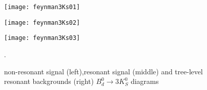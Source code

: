 \begin{figure}[h]
	\begin{minipage}[t]{0.33\linewidth} %
		\centering 
		\texttt{[image: feynman3Ks01]} 
		\label{fig:side:a} 
	\end{minipage}%
	\begin{minipage}[t]{0.33\linewidth} 
		\centering 
		\texttt{[image: feynman3Ks02]} 
		\label{fig:side:b} 
	\end{minipage}%
	\begin{minipage}[t]{0.33\linewidth} 
		\centering 
		\texttt{[image: feynman3Ks03]} 
		\label{fig:side:a} 
	\end{minipage} %
	\caption{non-resonant signal (left),resonant signal (middle) and tree-level resonant backgrounds (right)
		$B^0_d\to3K^0_S$ diagrams}.
\end{figure}


\begin{comment}
\begin{tikzpicture}
\begin{feynman}
\vertex (a1) {\( b\)};
\vertex[right=2cm of a1] (a3);
\vertex[right=2cm of a3] (a5) {\(c\)};
\vertex[below=1.25cm of a3] (a6) ;
\vertex[below=0.5cm of a5] (a7) {\(\overline{c}\)};
\vertex[below=1.5cm of a5] (a8) {\(s\)};
\vertex [below=0.75cm of a8] (b1) {\(\overline{d}\)};
\vertex [left=4.2cm of b1] (b3) {\(\overline{d}\)};
\diagram*{
{[edge=fermion],
(a1)--(a3)--(a5),
(b1)--(b3),
(a7)--(a6)--(a8),
},
(a3)--[photon, bend right] (a6),
};
\draw [decoration={brace}, decorate] (b3.south west) -- (a1.north west)
node [pos=0.5, left] {\(\overline{B^{0}}\)};
\draw [decoration={brace}, decorate]  (a8.north east)--(b1.south east) node [pos=0.5, right] {\(\overline{K^{0}}\)};
\draw [decoration={brace}, decorate]  (a5.north east)--(a7.south east) 
node [pos=0.5, right] {\(\chi_{c1}\)};
\end{feynman}
\end{tikzpicture}
\end{comment}
